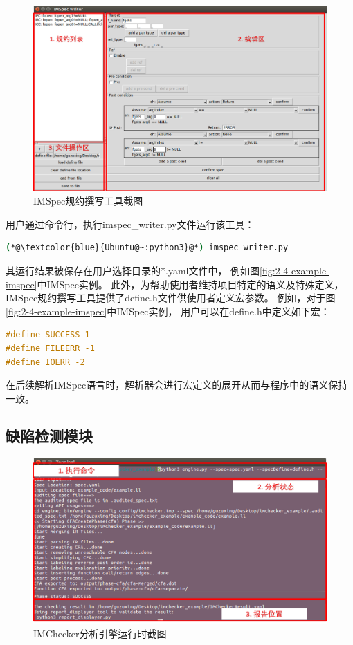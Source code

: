 \begin{figure}[t]
	\centering
	\includegraphics[width=0.85\linewidth]{figures/cp4-IMSpec-writer.png}
	\caption{
		IMSpec规约撰写工具截图
	}
	\label{fig:4-3-IMSpec-writer}
\end{figure}

用户通过命令行，执行imspec\_writer.py文件运行该工具：
\begin{lstlisting}[language={bash},
basicstyle=\linespread{0.8}\listingsfont,
numbers=none,
xleftmargin=.3\textwidth]
(*@\textcolor{blue}{Ubuntu@~:python3}@*) imspec_writer.py
\end{lstlisting}
其运行结果被保存在用户选择目录的*.yaml文件中，
例如图\ref{fig:2-4-example-imspec}中IMSpec实例。
此外，为帮助使用者维持项目特定的语义及特殊定义，
IMSpec规约撰写工具提供了define.h文件供使用者定义宏参数。
例如，对于图\ref{fig:2-4-example-imspec}中IMSpec实例，
用户可以在define.h中定义如下宏：
\begin{lstlisting}[language={C},
basicstyle=\linespread{0.8}\listingsfont,
numbers=none,
xleftmargin=.3\textwidth]
#define SUCCESS 1
#define FILEERR -1
#define IOERR -2
\end{lstlisting}
在后续解析IMSpec语言时，解析器会进行宏定义的展开从而与程序中的语义保持一致。




\subsection{缺陷检测模块}
\begin{figure}[b]
	\centering
	\includegraphics[width=0.85\linewidth]{figures/cp4-IMChecker-engine.png}
	\caption{
		IMChecker分析引擎运行时截图
	}
	\label{fig:4-3-IMChecker-engine}
\end{figure}

